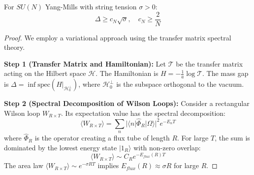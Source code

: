 \begin{theorem}
\label{thm:gt_proof}
For $SU(N)$ Yang-Mills with string tension $\sigma > 0$:
\begin{equation}
\Delta \geq c_N \sqrt{\sigma}, \quad c_N \geq \frac{2}{N}
\end{equation}
\end{theorem}

\begin{proof}
We employ a variational approach using the transfer matrix spectral theory.

\textbf{Step 1 (Transfer Matrix and Hamiltonian):}
Let $\mathcal{T}$ be the transfer matrix acting on the Hilbert space $\mathcal{H}$. The Hamiltonian is $H = -\frac{1}{a} \log \mathcal{T}$. The mass gap is $\Delta = \inf \mathrm{spec}(H|_{\mathcal{H}_0^\perp})$, where $\mathcal{H}_0^\perp$ is the subspace orthogonal to the vacuum.

\textbf{Step 2 (Spectral Decomposition of Wilson Loops):}
Consider a rectangular Wilson loop $W_{R \times T}$. Its expectation value has the spectral decomposition:
\begin{equation}
\langle W_{R \times T} \rangle = \sum_{n} |\langle n | \hat{\Phi}_R | \Omega \rangle|^2 e^{-E_n T}
\end{equation}
where $\hat{\Phi}_R$ is the operator creating a flux tube of length $R$.
For large $T$, the sum is dominated by the lowest energy state $|1_R\rangle$ with non-zero overlap:
\begin{equation}
\langle W_{R \times T} \rangle \sim C_R e^{-E_{flux}(R) T}
\end{equation}
The area law $\langle W_{R \times T} \rangle \sim e^{-\sigma R T}$ implies $E_{flux}(R) \approx \sigma R$ for large $R$.


\end{proof}
